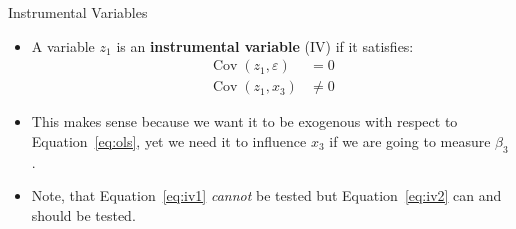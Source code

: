\documentclass[handout]{beamer} %
\DeclareMathOperator*{\Cov}{Cov}
\begin{document}
\begin{frame}{Instrumental Variables}

\begin{itemize}
  \item A variable $z_1$ is an \textbf{instrumental variable} (IV) if it
    satisfies:
    \begin{align}
      \Cov(z_1, \varepsilon) &= 0 \label{eq:iv1}\\
      \Cov(z_1, x_3) &\neq 0 \label{eq:iv2}
    \end{align}
  \item This makes sense because we want it to be exogenous with respect to
    Equation~\ref{eq:ols}, yet we need it to influence $x_3$ if we are going to
    measure $\beta_3$.
  \item Note, that Equation~\ref{eq:iv1} \textit{cannot} be tested but
    Equation~\ref{eq:iv2} can and should be tested.
\end{itemize}

\end{frame}

%
%
%
%
%
%
%
\end{document}

